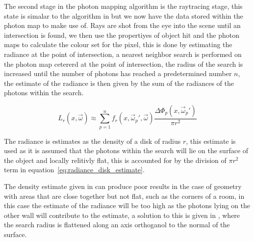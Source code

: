 The second stage in the photon mapping algorithm is the raytracing stage, this state is simalar
to the algorithm in \cite{whitted79a} but we now have the data stored within the photon map to make
use of. Rays are shot from the eye into the scene until an intersection is found, we then use
the propertiyes of object hit and the photon maps to calculate the colour set for the pixel, this
is done by estimating the radiance at the point of intersection, a nearest neighbor search is
performed on the photon map cetererd at the point of intersection, the radius of the search is
increased until the number of photons has reached a predetermined number $n$, the estimate of the
radiance is then given by the sum of the radiances of the photons within the search.

\begin{equation}
\label{eq:radiance_disk_estimate}
L_{r}(x, \vec{\omega})
\approx
\sum_{p=1}^n
f_{r}(x,\vec{\omega}_{p}', \vec{\omega})
\frac
{
	\Delta\Phi_{p}(x, \vec{\omega}_{p}')
}
{
\pi r^{2}
}
\end{equation}

The radiance is estimates as the density of a disk of radius $r$, this estimate is used as it is
assumed that the photons within the search will lie on the surface of the object and locally 
relitivly flat, this is accounted for by the division of $\pi r^2$ term in equation~\ref{eq:radiance_disk_estimate}.

The density estimate given in \cite{Jensen96a} can produce poor results in the case of geometry with
areas that are close together but not flat, such as the corners of a room, in this case the
estimate of the radiance will be too high as the photons lying on the other wall will contribute to
the estimate, a solution to this is given in \cite{JensenBook}, where the search radius is flattened along
an axis orthoganol to the normal of the surface.
